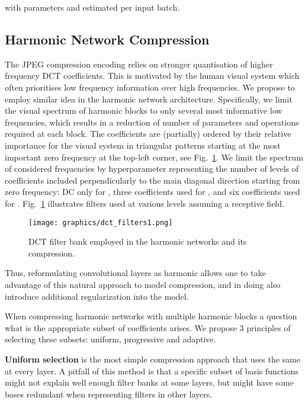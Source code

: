 \documentclass[12pt,a4paper]{article}
\begin{document}
with parameters  and  estimated per input batch.

\subsection{Harmonic Network Compression} \label{sec:method.subsample}


The JPEG compression encoding relies on stronger quantisation of higher frequency DCT coefficients. This is motivated by the human visual system which often prioritises low frequency information over high frequencies. We propose to employ similar idea in the harmonic network architecture. Specifically, we limit the visual spectrum of harmonic blocks to only several most informative low frequencies, which results in a reduction of number of parameters and operations required at each block. The coefficients are (partially) ordered by their relative importance for the visual system in triangular patterns starting at the most important zero frequency at the top-left corner, see Fig.~\ref{fig:filters}. We limit the spectrum of considered frequencies by hyperparameter  representing the number of levels of coefficients included perpendicularly to the main diagonal direction starting from zero frequency: DC only for , three coefficients used for , and six coefficients used for .
Fig.~\ref{fig:filters} illustrates filters used at various levels assuming a  receptive field.
\begin{figure}[t]
\begin{center}
   \texttt{[image: graphics/dct\_filters1.png]}
\end{center}
\vspace{-.5\baselineskip}
   \caption{  DCT filter bank employed in the harmonic networks and its compression.}
\label{fig:filters}
\end{figure} 
Thus, reformulating convolutional layers as harmonic allows one  to take advantage of this natural approach to model compression, and in doing also introduce additional regularization into the model.

When compressing harmonic networks with multiple harmonic blocks a question what is the appropriate subset of coefficients arises. We propose 3 principles of selecting these subsets: uniform, progressive and adaptive. 

\noindent\textbf{Uniform selection} is the most simple compression approach that uses the same  at every layer. A pitfall of this method is that a specific subset of basis functions might not explain well enough filter banks at some layers, but might have some bases redundant when representing filters in other layers.
\end{document}
